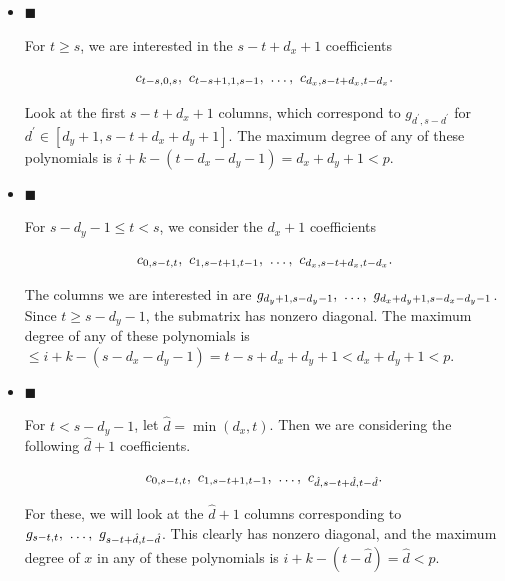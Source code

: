 \begin{itemize}


\item[] 
$\blacksquare$ 


For $t\geq s$, we are interested in the $s-t+d_{x}+1$ coefficients\par


\[\begin{gathered}
c_{t-s,0,s},\nobreak\ c_{t-s+1,1,s-1},\nobreak\ \dots,\nobreak\ c_{d_{x},s-t+d_{x},t-d_{x}}.
\end{gathered}\]


Look at the first $s-t+d_{x}+1$ columns, which correspond to $g_{d^{\prime},s-d^{\prime}}$ for $d^{\prime}\in[d_{y}+1,s-t+d_{x}+d_{y}+1]$. The maximum degree of any of these polynomials is $i+k-(t-d_{x}-d_{y}-1)=d_{x}+d_{y}+1<p$.\par





\item[] 
$\blacksquare$ 


For $s-d_{y}-1\leq t<s$, we consider the $d_{x}+1$ coefficients\par


\[\begin{gathered}
c_{0,s-t,t},\nobreak\ c_{1,s-t+1,t-1},\nobreak\ \dots,\nobreak\ c_{d_{x},s-t+d_{x},t-d_{x}}.
\end{gathered}\]


The columns we are interested in are $g_{d_{y}+1,s-d_{y}-1},\nobreak\ \dots,\nobreak\ g_{d_{x}+d_{y}+1,s-d_{x}-d_{y}-1}$. Since $t\geq s-d_{y}-1$, the submatrix has nonzero diagonal. The maximum degree of any of these polynomials is $\leq i+k-(s-d_{x}-d_{y}-1)=t-s+d_{x}+d_{y}+1<d_{x}+d_{y}+1<p$.\par





\item[] 
$\blacksquare$ 


For $t<s-d_{y}-1$, let $\hat{d}=\min(d_{x},t)$. Then we are considering the following $\hat{d}+1$ coefficients.\par


\[\begin{gathered}
c_{0,s-t,t},\nobreak\ c_{1,s-t+1,t-1},\nobreak\ \dots,\nobreak\ c_{\hat{d},s-t+\hat{d},t-\hat{d}}.
\end{gathered}\]


For these, we will look at the $\hat{d}+1$ columns corresponding to $g_{s-t,t},\nobreak\ \dots,\nobreak\ g_{s-t+\hat{d},t-\hat{d}}$. This clearly has nonzero diagonal, and the maximum degree of $x$ in any of these polynomials is $i+k-(t-\hat{d})=\hat{d}<p$.\par





\end{itemize}


